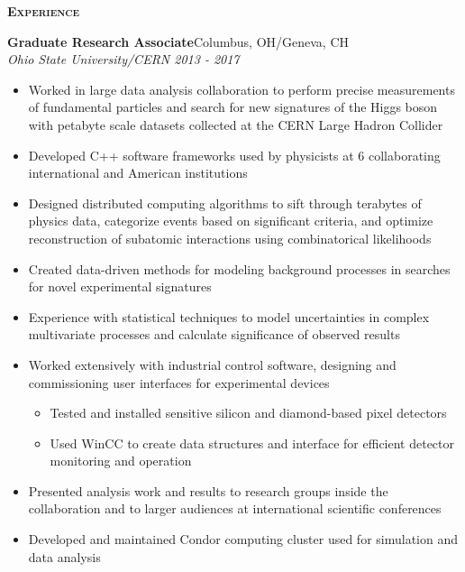 \documentclass[line]{letter}
\begin{document}
{\vspace{5pt} \Large \textsc{\textbf{Experience}}}
\begin{addmargin}[1em]{1em}
{\large {\bf Graduate Research Associate}\hfill Columbus, OH/Geneva, CH\vspace{1mm}}\\
{\large \it Ohio State University/CERN \hfill  2013 - 2017} \\
\vspace{-6mm}
\begin{itemize}[leftmargin=5mm]
\item Worked in large data analysis collaboration to perform precise measurements of fundamental particles and search for new signatures of the Higgs boson with petabyte scale datasets collected at the CERN Large Hadron Collider
\item Developed C++ software frameworks used by physicists at 6 collaborating international and American institutions
\item Designed distributed computing algorithms to sift through terabytes of physics data, categorize events based on significant criteria, and optimize reconstruction of subatomic interactions using combinatorical likelihoods 
\item Created data-driven methods for modeling background processes in searches for novel experimental signatures 
\item Experience with statistical techniques to model uncertainties in complex multivariate processes and calculate significance of observed results
\item Worked extensively with industrial control software, designing and commissioning user interfaces for experimental devices
\begin{itemize}
\item Tested and installed sensitive silicon and diamond-based pixel detectors
\item Used WinCC to create data structures and interface for efficient detector monitoring and operation
\end{itemize}%
\item Presented analysis work and results to research groups inside the collaboration and to larger audiences at international scientific conferences%
\item Developed and maintained Condor computing cluster used for simulation and data analysis
\end{itemize}
\vspace{1mm}


\end{addmargin}
\end{document}
